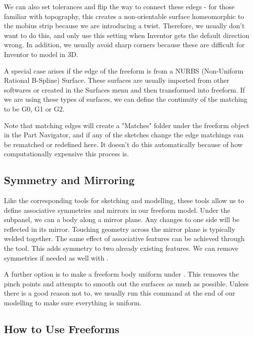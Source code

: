 We can also set tolerances and flip the way to connect these edegs - for those familiar with topography, this creates a non-orientable surface homeomorphic to the mobius strip because we are introducing a twist. Therefore, we usually don't want to do this, and only use this setting when Inventor gets the default direction wrong. In addition, we usually avoid sharp corners because these are difficult for Inventor to model in 3D. 

A special case arises if the edge of the freeform is from a NURBS (Non-Uniform Rational B-Spline) Surface. These surfaces are usually imported from other softwares or created in the Surfaces menu and then transformed into freeform. If we are using these types of surfaces, we can define the continuity of the matching to be G0, G1 or G2.

Note that matching edges will create a "Matches" folder under the freeform object in the Part Navigator, and if any of the sketches change the edge matchings can be rematched or redefined here. It doesn't do this automatically because of how computationally expensive this process is. 


\label{subsection:freeform-symmetry}
\subsection{Symmetry and Mirroring}

Like the corresponding tools for sketching and modelling, these tools allow us to define associative symmetries and mirrors in our freeform model. Under the  subpanel, we can  a body along a mirror plane. Any changes to one side will be reflected in its mirror. Touching geometry across the mirror plane is typically welded together. The same effect of associative features can be achieved through the  tool. This adds symmetry to two already existing features. We can remove symmetries if needed as well with .

A further option is to make a freeform body uniform under . This removes the pinch points and attempts to smooth out the surfaces as much as possible. Unless there is a good reason not to, we usually run this command at the end of our modelling to make sure everything is uniform.

\subsection{How to Use Freeforms}

